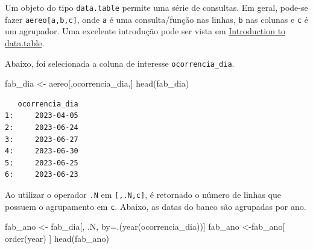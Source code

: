 \documentclass[
  letterpaper,
  DIV=11,
  numbers=noendperiod]{scrreprt}
\newenvironment{Shaded}{\begin{snugshade}}{\end{snugshade}}
\newcommand{\AttributeTok}[1]{\textcolor[rgb]{0.40,0.45,0.13}{#1}}
\newcommand{\FunctionTok}[1]{\textcolor[rgb]{0.28,0.35,0.67}{#1}}
\newcommand{\NormalTok}[1]{\textcolor[rgb]{0.00,0.23,0.31}{#1}}
\newcommand{\OtherTok}[1]{\textcolor[rgb]{0.00,0.23,0.31}{#1}}
\newcommand{\SpecialCharTok}[1]{\textcolor[rgb]{0.37,0.37,0.37}{#1}}
\newcommand{\StringTok}[1]{\textcolor[rgb]{0.13,0.47,0.30}{#1}}
\theoremstyle{plain}
\theoremstyle{definition}
\theoremstyle{definition}
\theoremstyle{remark}
\begin{document}
\begin{Shaded}
\end{Shaded}

Um objeto do tipo \texttt{data.table} permite uma série de consultas. Em
geral, pode-se fazer \texttt{aereo{[}a,b,c{]}}, onde \texttt{a} é uma
consulta/função nas linhas, \texttt{b} nas colunas e \texttt{c} é um
agrupador. Uma excelente introdução pode ser vista em
\href{https://cran.r-project.org/web/packages/data.table/vignettes/datatable-intro.html}{Introduction
to data.table}.

Abaixo, foi selecionada a coluna de interesse \texttt{ocorrencia\_dia}.

\begin{Shaded}
\begin{Highlighting}[]
\NormalTok{fab\_dia }\OtherTok{\textless{}{-}}\NormalTok{ aereo[,}\StringTok{\textquotesingle{}ocorrencia\_dia\textquotesingle{}}\NormalTok{,]}
\FunctionTok{head}\NormalTok{(fab\_dia)}
\end{Highlighting}
\end{Shaded}

\begin{verbatim}
   ocorrencia_dia
1:     2023-04-05
2:     2023-06-24
3:     2023-06-27
4:     2023-06-30
5:     2023-06-25
6:     2023-06-23
\end{verbatim}

Ao utilizar o operador \texttt{.N} em \texttt{{[},.N,c{]}}, é retornado
o número de linhas que possuem o agrupamento em \texttt{c}. Abaixo, as
datas do banco são agrupadas por ano.

\begin{Shaded}
\begin{Highlighting}[]
\NormalTok{fab\_ano }\OtherTok{\textless{}{-}}\NormalTok{ fab\_dia[, .N, by}\OtherTok{=}\NormalTok{.(}\FunctionTok{year}\NormalTok{(ocorrencia\_dia))]}
\NormalTok{fab\_ano }\OtherTok{\textless{}{-}}\NormalTok{fab\_ano[ }\FunctionTok{order}\NormalTok{(year) ]}
\FunctionTok{head}\NormalTok{(fab\_ano)}
\end{Highlighting}
\end{Shaded}
\end{document}

